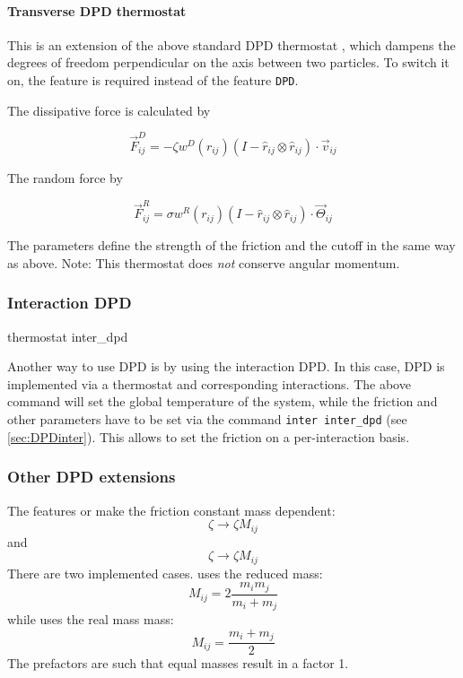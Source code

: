 \paragraph{Transverse DPD thermostat}\label{sec:transDPD}
This is an extension of the above standard DPD thermostat
\cite{junghans2008}, which dampens the degrees of freedom
perpendicular on the axis between two particles. To switch it on, the
feature  is required instead of the feature
\texttt{DPD}.

The dissipative force is calculated by

$$ \vec{F}_{ij}^{D} = -\zeta w^D (r_{ij}) (I-\hat{r}_{ij}\otimes\hat{r}_{ij}) \cdot \vec{v}_{ij}$$

The random force by

$$ \vec{F}_{ij}^R = \sigma w^R (r_{ij}) (I-\hat{r}_{ij}\otimes\hat{r}_{ij}) \cdot \vec{\Theta}_{ij}$$

The parameters   define the strength of the
friction and the cutoff in the same way as above.  Note: This
thermostat does \emph{not} conserve angular momentum.

\subsubsection{Interaction DPD}\label{sec:interDPD}

\begin{essyntax}
  thermostat inter_dpd 
  \begin{features}
  \end{features}
\end{essyntax}

Another way to use DPD is by using the interaction DPD. In this case,
DPD is implemented via a thermostat and corresponding interactions.
The above command will set the global temperature of the system, while
the friction and other parameters have to be set via the command
\texttt{inter inter_dpd} (see \vref{sec:DPDinter}).  This allows to
set the friction on a per-interaction basis.

\subsubsection{Other DPD extensions}
The features  or  make the
friction constant mass dependent:
$$ \zeta \to \zeta M_{ij} $$ 
and 
$$ \zeta \to \zeta M_{ij} $$
There are two implemented cases.  uses the
reduced mass:
$$ M_{ij}=2\frac{m_i m_j}{m_i+m_j} $$
while  uses the real mass mass:
$$ M_{ij}=\frac{m_i+m_j}{2} $$
The prefactors are such that equal masses result in a factor 1.

